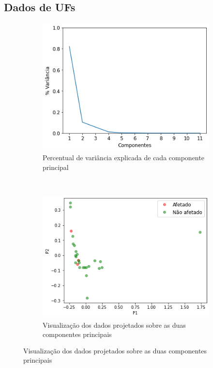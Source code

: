 \subsection{Dados de UFs}
\label{section:deteccao-impacto:uf}

\begin{figure}[htb] 
    \centering 
    \caption{PCA sobre dados mensais de UFs}
    \label{fig:resultados:base-de-dados-24-pca-monthly-uf} 
    \begin{subfigure}[b]{0.45\textwidth}
        \includegraphics[scale=0.45]{images/base-de-dados-24.1-pca-components-monthly-uf.png}
        \caption{Percentual de variância explicada de cada componente principal}
        \label{fig:resultados:base-de-dados-24.1-pca-components-monthly-uf}
    \end{subfigure} ~ \quad
    \begin{subfigure}[b]{0.45\textwidth}
        \includegraphics[scale=0.45]{images/base-de-dados-24.2-pca-2d-monthly-uf.png}
        \caption{Visualização dos dados projetados sobre as duas componentes principais}
        \label{fig:resultados:base-de-dados-24.2-pca-2d-monthly-uf}
    \end{subfigure}
    \fdadospesquisa
\end{figure}

